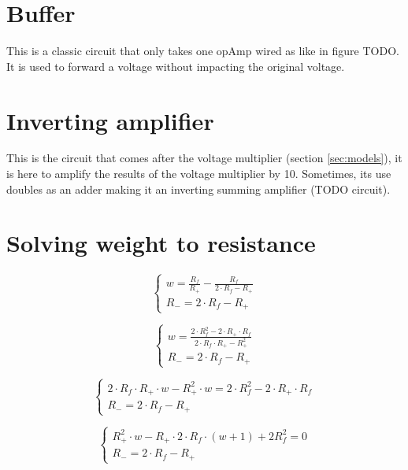 \label{ap:a}

\section{Buffer}\label{apsec:buffer}

This is a classic circuit that only takes one \ac{opAmp} wired as like in figure TODO. It is used to forward a voltage without impacting the original voltage.

\section{Inverting amplifier}\label{apsec:invAmp}

This is the circuit that comes after the voltage multiplier (section \ref{sec:models}), it is here to amplify the results of the voltage multiplier by 10. Sometimes, its use doubles as an adder making it an inverting summing amplifier (TODO circuit).

\section{Solving weight to resistance}\label{apsec:wei2res}

\begin{equation}\label{eq:wei2res3}
  \begin{cases}
    w=\frac{R_f}{R_+}-\frac{R_f}{2\cdot R_f -R_+}\\
    R_-=2\cdot R_f -R_+
  \end{cases}
\end{equation}


\begin{equation}\label{eq:wei2res4}
  \begin{cases}
    w=\frac{2\cdot R_f^2-2\cdot R_+\cdot R_f}{2\cdot R_f\cdot R_+ -R_+^2}\\
    R_-=2\cdot R_f -R_+
  \end{cases}
\end{equation}

\begin{equation}\label{eq:wei2res5}
  \begin{cases}
    2\cdot R_f\cdot R_+\cdot w -R_+^2\cdot w=2\cdot R_f^2-2\cdot R_+\cdot R_f\\
    R_-=2\cdot R_f -R_+
  \end{cases}
\end{equation}

\begin{equation}\label{eq:wei2res6}
  \begin{cases}
    R_+^2\cdot w - R_+\cdot 2\cdot R_f \cdot(w+1) + 2R_f^2 = 0\\
    R_-=2\cdot R_f -R_+
  \end{cases}
\end{equation}

